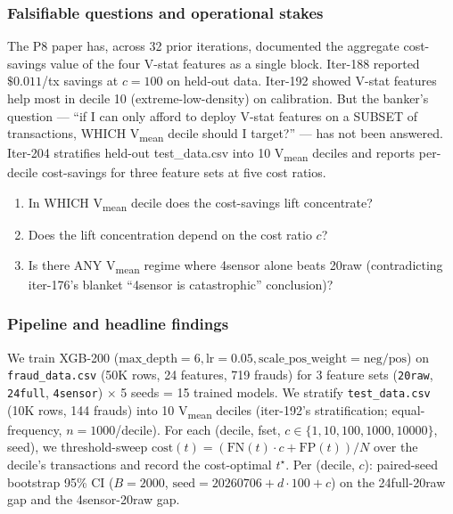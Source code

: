 \documentclass{article}
\begin{document}
\subsubsection{Falsifiable questions and operational stakes}\label{sec:p8-iter204-questions}
The P8 paper has, across 32 prior iterations, documented the aggregate
cost-savings value of the four V-stat features as a single block.
Iter-188 reported $\$0.011$/tx savings at $c{=}100$ on held-out data.
Iter-192 showed V-stat features help most in decile 10 (extreme-low-density)
on calibration. But the banker's question --- ``if I can only afford to
deploy V-stat features on a SUBSET of transactions, WHICH V\textsubscript{mean}
decile should I target?'' --- has not been answered. Iter-204 stratifies
held-out test\_data.csv into 10 V\textsubscript{mean} deciles and reports
per-decile cost-savings for three feature sets at five cost ratios.

\begin{enumerate}
\item In WHICH V\textsubscript{mean} decile does the cost-savings lift
  concentrate?
\item Does the lift concentration depend on the cost ratio $c$?
\item Is there ANY V\textsubscript{mean} regime where 4sensor alone beats
  20raw (contradicting iter-176's blanket ``4sensor is catastrophic''
  conclusion)?
\end{enumerate}

\subsubsection{Pipeline and headline findings}\label{sec:p8-iter204-pipeline}
We train XGB-200 ($\mathrm{max\_depth}{=}6, \mathrm{lr}{=}0.05,
\mathrm{scale\_pos\_weight}{=}\mathrm{neg}/\mathrm{pos}$) on
\texttt{fraud\_data.csv} (50K rows, 24 features, 719 frauds) for 3 feature
sets (\texttt{20raw}, \texttt{24full}, \texttt{4sensor}) $\times$ 5 seeds
= 15 trained models. We stratify \texttt{test\_data.csv} (10K rows,
144 frauds) into 10 V\textsubscript{mean} deciles (iter-192's
stratification; equal-frequency, $n{=}1000$/decile). For each
(decile, fset, $c \in \{1, 10, 100, 1000, 10000\}$, seed), we
threshold-sweep $\mathrm{cost}(t) = (\mathrm{FN}(t) \cdot c + \mathrm{FP}(t))/N$
over the decile's transactions and record the cost-optimal $t^{\star}$.
Per (decile, $c$): paired-seed bootstrap 95\% CI ($B{=}2000$,
$\mathrm{seed}{=}20260706{+}d{\cdot}100{+}c$) on the
24full-20raw gap and the 4sensor-20raw gap.
\end{document}
